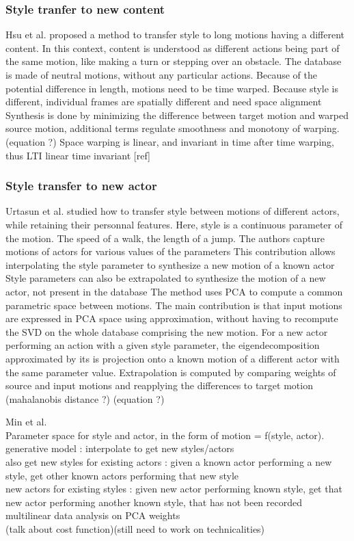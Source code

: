 \documentclass[11pt]{sdm}
\begin{document}
\subsubsection{Style tranfer to new content}

Hsu et al. \cite{hsu2005style} proposed a method to transfer style to long motions having a different content. In this context, content is understood as different actions being part of the same motion, like making a turn or stepping over an obstacle.
The database is made of neutral motions, without any particular actions.
Because of the potential difference in length, motions need to be time warped. Because style is different, individual frames are spatially different and need space alignment
Synthesis is done by minimizing the difference between target motion and warped source motion, additional terms regulate smoothness and monotony of warping. (equation ?)
Space warping is linear, and invariant in time after time warping, thus LTI linear time invariant [ref]

\subsubsection{Style transfer to new actor}

Urtasun et al. \cite{urtasun2004style} studied how to transfer style between motions of different actors, while retaining their personnal features.
Here, style is a continuous parameter of the motion. The speed of a walk, the length of a jump.
The authors capture motions of actors for various values of the parameters
This contribution allows interpolating the style parameter to synthesize a new motion of a known actor 
Style parameters can also be extrapolated to synthesize the motion of a new actor, not present in the database
The method uses PCA to compute a common parametric space between motions.
The main contribution is that input motions are expressed in PCA space using approximation, without having to recompute the SVD on the whole database comprising the new motion.
For a new actor performing an action with a given style parameter, the eigendecomposition approximated by its is projection onto a known motion of a different actor with the same parameter value.
Extrapolation is computed by comparing weights of source and input motions and reapplying the differences to target motion
(mahalanobis distance ?)
(equation ?)


Min et al. \cite{min2010synthesis} \\
Parameter space for style and actor, in the form of motion = f(style, actor).\\
generative model : interpolate to get new styles/actors\\
also get new styles for existing actors : given a known actor performing a new style, get other known actors performing that new style\\
new actors for existing styles : given new actor performing known style, get that new actor performing another known style, that has not been recorded\\
multilinear data analysis on PCA weights \\
(talk about cost function)(still need to work on technicalities)
\end{document}
